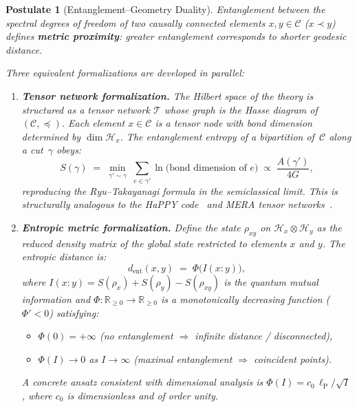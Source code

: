 \documentclass[12pt,a4paper]{article}
\theoremstyle{postulate}
\newtheorem{postulate}{Postulate}
\newcommand{\Hil}{\mathcal{H}}
\newcommand{\Causal}{\mathcal{C}}
\newcommand{\planck}{\ell_{\mathrm{P}}}
\begin{document}
\begin{postulate}[Entanglement--Geometry Duality]\label{post:entanglement}
Entanglement between the spectral degrees of freedom of two causally
connected elements $x, y \in \Causal$ ($x \prec y$) defines
\textbf{metric proximity}: greater entanglement corresponds to shorter
geodesic distance.

Three equivalent formalizations are developed in parallel:
\begin{enumerate}[label=\textbf{(\Alph*)}]

\item \textbf{Tensor network formalization.}\quad
The Hilbert space of the theory is structured as a tensor network
$\mathcal{T}$ whose graph is the Hasse diagram of $(\Causal, \preceq)$.
Each element $x \in \Causal$ is a tensor node with bond dimension
determined by $\dim \Hil_x$.  The entanglement entropy of a bipartition
of~$\Causal$ along a cut~$\gamma$ obeys:
\begin{equation}\label{eq:RT-TN}
  S(\gamma) \;=\; \min_{\gamma' \sim \gamma}\; \sum_{e \in \gamma'}
  \ln\!\bigl(\text{bond dimension of } e\bigr)
  \;\propto\; \frac{A(\gamma')}{4G},
\end{equation}
reproducing the Ryu--Takayanagi formula in the semiclassical limit.
This is structurally analogous to the HaPPY code~\cite{Pastawski2015}
and MERA tensor networks~\cite{Vidal2007}.

\item \textbf{Entropic metric formalization.}\quad
Define the state $\rho_{xy}$ on $\Hil_x \otimes \Hil_y$ as the reduced
density matrix of the global state restricted to elements $x$ and $y$.
The \emph{entropic distance} is:
\begin{equation}\label{eq:entropic-distance}
  d_{\mathrm{ent}}(x, y) \;=\; \Phi\!\bigl(I(x : y)\bigr),
\end{equation}
where $I(x:y) = S(\rho_x) + S(\rho_y) - S(\rho_{xy})$ is the quantum
mutual information and $\Phi : \mathbb{R}_{\geq 0} \to \mathbb{R}_{\geq 0}$
is a monotonically decreasing function ($\Phi' < 0$) satisfying:
\begin{itemize}
  \item $\Phi(0) = +\infty$ (no entanglement $\Rightarrow$ infinite distance
        / disconnected),
  \item $\Phi(I) \to 0$ as $I \to \infty$ (maximal entanglement
        $\Rightarrow$ coincident points).
\end{itemize}
A concrete ansatz consistent with dimensional analysis is
$\Phi(I) = c_0\,\planck / \sqrt{I}$, where $c_0$ is dimensionless and
of order unity.


\end{enumerate}
\end{postulate}
\end{document}
